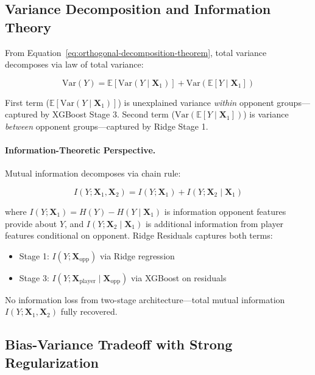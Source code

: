 \subsection{Variance Decomposition and Information Theory}

From Equation~\ref{eq:orthogonal-decomposition-theorem}, total variance decomposes via law of total variance:

\begin{equation}
\text{Var}(Y) = \mathbb{E}[\text{Var}(Y \mid \mathbf{X}_1)] + \text{Var}(\mathbb{E}[Y \mid \mathbf{X}_1])
\label{eq:law-total-variance}
\end{equation}

First term ($\mathbb{E}[\text{Var}(Y \mid \mathbf{X}_1)]$) is unexplained variance \emph{within} opponent groups---captured by XGBoost Stage 3. Second term ($\text{Var}(\mathbb{E}[Y \mid \mathbf{X}_1])$) is variance \emph{between} opponent groups---captured by Ridge Stage 1.

\paragraph{Information-Theoretic Perspective.}
Mutual information decomposes via chain rule:

\begin{equation}
I(Y; \mathbf{X}_1, \mathbf{X}_2) = I(Y; \mathbf{X}_1) + I(Y; \mathbf{X}_2 \mid \mathbf{X}_1)
\label{eq:mutual-information-chain}
\end{equation}

where $I(Y; \mathbf{X}_1) = H(Y) - H(Y \mid \mathbf{X}_1)$ is information opponent features provide about $Y$, and $I(Y; \mathbf{X}_2 \mid \mathbf{X}_1)$ is additional information from player features conditional on opponent. Ridge Residuals captures both terms:

\begin{itemize}[itemsep=2pt,parsep=0pt]
    \item Stage 1: $I(Y; \mathbf{X}_{\text{opp}})$ via Ridge regression
    \item Stage 3: $I(Y; \mathbf{X}_{\text{player}} \mid \mathbf{X}_{\text{opp}})$ via XGBoost on residuals
\end{itemize}

No information loss from two-stage architecture---total mutual information $I(Y; \mathbf{X}_1, \mathbf{X}_2)$ fully recovered.

\subsection{Bias-Variance Tradeoff with Strong Regularization}

